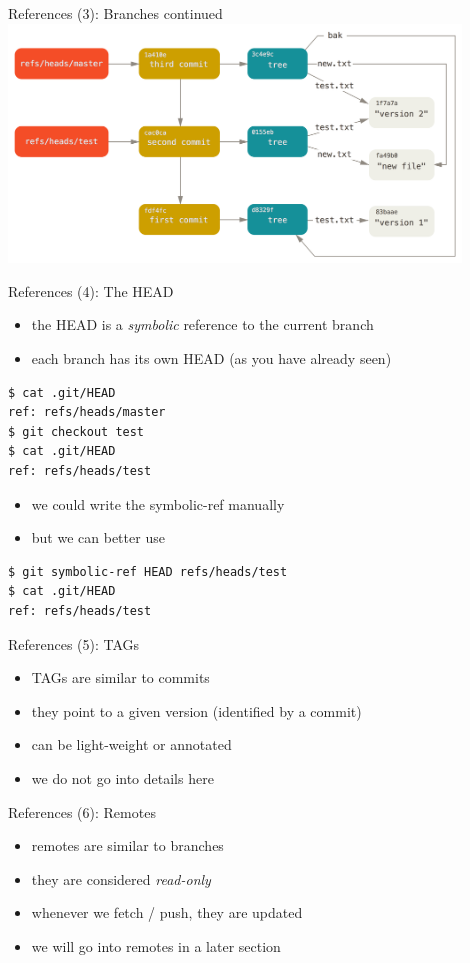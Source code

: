\begin{frame}[fragile]{References (3): Branches continued}
  \includegraphics[width=0.90\textwidth]{imgs/branch_tree}
\end{frame}

\begin{frame}[fragile]{References (4): The HEAD}
  \begin{itemize}
    \item the HEAD is a \textit{symbolic} reference to the current branch
    \item each branch has its own HEAD (as you have already seen)
  \end{itemize}
\begin{lstlisting}[style=ShellCmd]
$ cat .git/HEAD
ref: refs/heads/master
$ git checkout test
$ cat .git/HEAD
ref: refs/heads/test
\end{lstlisting}
\begin{itemize}
  \item we could write the symbolic-ref manually
  \item but we can better use
\end{itemize}
\begin{lstlisting}[style=ShellCmd]
$ git symbolic-ref HEAD refs/heads/test
$ cat .git/HEAD
ref: refs/heads/test
\end{lstlisting}
\end{frame}

\begin{frame}[fragile]{References (5): TAGs}
  \begin{itemize}
    \item TAGs are similar to commits
    \item they point to a given version (identified by a commit)
    \item can be light-weight or annotated
    \item we do not go into details here
  \end{itemize}
\end{frame}

\begin{frame}[fragile]{References (6): Remotes}
  \begin{itemize}
    \item remotes are similar to branches
    \item they are considered \textit{read-only}
    \item whenever we fetch / push, they are updated
    \item we will go into remotes in a later section
  \end{itemize}
\end{frame}